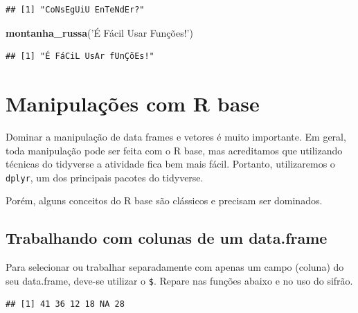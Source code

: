 \documentclass[]{book}
\newenvironment{Shaded}{\begin{snugshade}}{\end{snugshade}}
\newcommand{\KeywordTok}[1]{\textcolor[rgb]{0.13,0.29,0.53}{\textbf{#1}}}
\newcommand{\StringTok}[1]{\textcolor[rgb]{0.31,0.60,0.02}{#1}}
\newcommand{\OperatorTok}[1]{\textcolor[rgb]{0.81,0.36,0.00}{\textbf{#1}}}
\newcommand{\NormalTok}[1]{#1}
\begin{document}
\begin{verbatim}
## [1] "CoNsEgUiU EnTeNdEr?"
\end{verbatim}

\begin{Shaded}
\begin{Highlighting}[]
\KeywordTok{montanha_russa}\NormalTok{(}\StringTok{'É Fácil Usar Funções!'}\NormalTok{)}
\end{Highlighting}
\end{Shaded}

\begin{verbatim}
## [1] "É FáCiL UsAr fUnÇõEs!"
\end{verbatim}

\section{Manipulações com R base}\label{manipulacoes-com-r-base}

Dominar a manipulação de data frames e vetores é muito importante. Em
geral, toda manipulação pode ser feita com o R base, mas acreditamos que
utilizando técnicas do tidyverse a atividade fica bem mais fácil.
Portanto, utilizaremos o \texttt{dplyr}, um dos principais pacotes do
tidyverse.

Porém, alguns conceitos do R base são clássicos e precisam ser
dominados.

\subsection{Trabalhando com colunas de um
data.frame}\label{trabalhando-com-colunas-de-um-data.frame}

Para selecionar ou trabalhar separadamente com apenas um campo (coluna)
do seu data.frame, deve-se utilizar o \texttt{\$}. Repare nas funções
abaixo e no uso do sifrão.

\begin{Shaded}
\end{Shaded}

\begin{verbatim}
## [1] 41 36 12 18 NA 28
\end{verbatim}

\begin{Shaded}
\end{Shaded}
\end{document}
